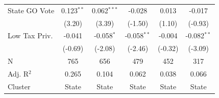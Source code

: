\begin{tabular*}{\textwidth}{@{\extracolsep{\fill}}lccccc}
   State GO Vote        & 0.123$^{**}$   & 0.062$^{***}$  & -0.028        & 0.013         & -0.017\\   
                        & (3.20)        & (3.39)        & (-1.50)      & (1.10)       & (-0.93)\\   
   Low Tax Priv.        & -0.041         & -0.058$^{*}$   & -0.058$^{**}$ & -0.004        & -0.082$^{**}$\\   
                        & (-0.69)       & (-2.08)       & (-2.46)      & (-0.32)      & (-3.09)\\   
   \hline
   N         & 765            & 656            & 479           & 452           & 317\\  
   Adj. R$^2$       & 0.265          & 0.104          & 0.062         & 0.038         & 0.066\\  
   Cluster              & State & State & State & State & State\\  
   \bottomrule
\end{tabular*}
\par\endgroup
